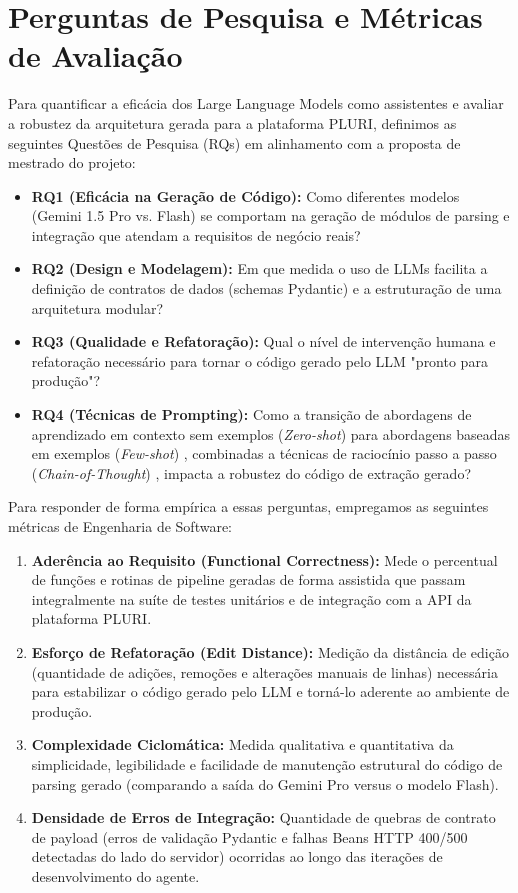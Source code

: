 \documentclass[sigconf]{acmart}
\begin{document}
\section{Perguntas de Pesquisa e Métricas de Avaliação}
Para quantificar a eficácia dos Large Language Models como assistentes e avaliar a robustez da arquitetura gerada para a plataforma PLURI, definimos as seguintes Questões de Pesquisa (RQs) em alinhamento com a proposta de mestrado do projeto:
\begin{itemize}
\item \textbf{RQ1 (Eficácia na Geração de Código):} Como diferentes modelos (Gemini 1.5 Pro vs. Flash) se comportam na geração de módulos de parsing e integração que atendam a requisitos de negócio reais?
\item \textbf{RQ2 (Design e Modelagem):} Em que medida o uso de LLMs facilita a definição de contratos de dados (schemas Pydantic) e a estruturação de uma arquitetura modular?
\item \textbf{RQ3 (Qualidade e Refatoração):} Qual o nível de intervenção humana e refatoração necessário para tornar o código gerado pelo LLM "pronto para produção"?
\item \textbf{RQ4 (Técnicas de Prompting):} Como a transição de abordagens de aprendizado em contexto sem exemplos (\textit{Zero-shot}) para abordagens baseadas em exemplos (\textit{Few-shot}) \cite{brown2020language}, combinadas a técnicas de raciocínio passo a passo (\textit{Chain-of-Thought}) \cite{wei2022chain}, impacta a robustez do código de extração gerado?
\end{itemize}

Para responder de forma empírica a essas perguntas, empregamos as seguintes métricas de Engenharia de Software:
\begin{enumerate}
\item \textbf{Aderência ao Requisito (Functional Correctness):} Mede o percentual de funções e rotinas de pipeline geradas de forma assistida que passam integralmente na suíte de testes unitários e de integração com a API da plataforma PLURI.
\item \textbf{Esforço de Refatoração (Edit Distance):} Medição da distância de edição (quantidade de adições, remoções e alterações manuais de linhas) necessária para estabilizar o código gerado pelo LLM e torná-lo aderente ao ambiente de produção.
\item \textbf{Complexidade Ciclomática:} Medida qualitativa e quantitativa da simplicidade, legibilidade e facilidade de manutenção estrutural do código de parsing gerado (comparando a saída do Gemini Pro versus o modelo Flash).
\item \textbf{Densidade de Erros de Integração:} Quantidade de quebras de contrato de payload (erros de validação Pydantic e falhas Beans HTTP 400/500 detectadas do lado do servidor) ocorridas ao longo das iterações de desenvolvimento do agente.
\end{enumerate}
\end{document}
